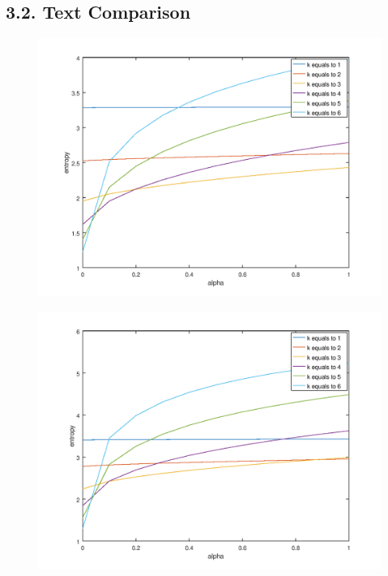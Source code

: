 \documentclass[12pt]{article}
\begin{document}
\subsection*{3.2. Text Comparison}

\begin{figure}
  \centering
  \begin{minipage}{.5\textwidth}
    \centering
    \includegraphics[width=\linewidth]{bible_en.png}
    \label{fig:enEntropy}
  \end{minipage}%
  \begin{minipage}{.5\textwidth}
    \centering
    \includegraphics[width=\linewidth]{bible_pt.png}
    \label{fig:ptEntropy}
  \end{minipage}
\end{figure}
\end{document}
